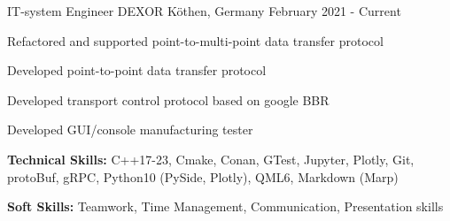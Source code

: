 

\begin{cventries}

  \cventry
    {IT-system Engineer} %
    {DEXOR} %
    {Köthen, Germany} %
    {February 2021 - Current} %
    {
      \begin{cvitems} %
        \item {Refactored and supported point-to-multi-point data transfer protocol}
        \item {Developed point-to-point data transfer protocol}
        \item {Developed transport control protocol based on google BBR}
        \item {Developed GUI/console manufacturing tester}
        \item {\textbf{Technical Skills:} C++17-23, Cmake, Conan, GTest, Jupyter, Plotly, Git, protoBuf, gRPC, Python10 (PySide, Plotly), QML6, Markdown (Marp)}
        \item {\textbf{Soft Skills:} Teamwork, Time Management, Communication, Presentation skills}
      \end{cvitems}
    }


\end{cventries}
